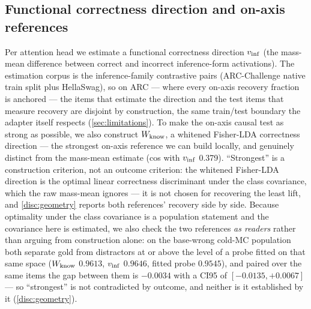 \subsection{Functional correctness direction and on-axis references}
\label{method:directions}

Per attention head we estimate a functional correctness direction $v_{\mathrm{inf}}$ (the
mass-mean difference between correct and incorrect inference-form activations). The
estimation corpus is the inference-family contrastive pairs (ARC-Challenge native
train split plus HellaSwag), so on ARC --- where every on-axis recovery fraction is
anchored --- the items that estimate the direction and the test items that measure
recovery are disjoint by construction, the same train/test boundary the adapter
itself respects (\cref{sec:limitations}). To make the on-axis causal test as strong
as possible, we also construct $W_{\mathrm{know}}$, a whitened Fisher-LDA correctness direction
--- the strongest on-axis reference we can build locally, and genuinely distinct
from the mass-mean estimate (cos with $v_{\mathrm{inf}}$ 0.379). ``Strongest'' is a
construction criterion, not an outcome criterion: the whitened Fisher-LDA direction
is the optimal linear correctness discriminant under the class covariance, which the
raw mass-mean ignores --- it is not chosen for recovering the least lift, and
\cref{disc:geometry} reports both references' recovery side by side. Because
optimality under the class covariance is a population statement and the covariance
here is estimated, we also check the two references \emph{as readers} rather than
arguing from construction alone: on the base-wrong cold-MC population both separate
gold from distractors at or above the level of a probe fitted on that same space
($W_{\mathrm{know}}$ $0.9613$, $v_{\mathrm{inf}}$ $0.9646$, fitted probe $0.9545$), and paired over the
same items the gap between them is $-0.0034$ with a CI95 of $[-0.0135, +0.0067]$ ---
so ``strongest'' is not contradicted by outcome, and neither is it established by
it (\cref{disc:geometry}).

